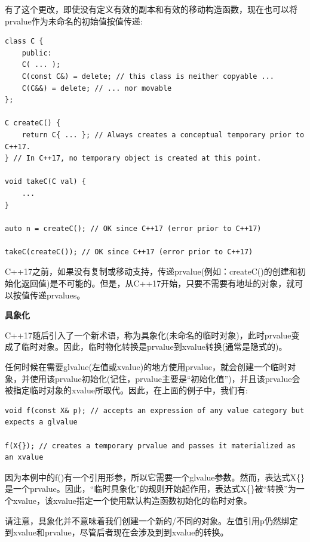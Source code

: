 有了这个更改，即使没有定义有效的副本和有效的移动构造函数，现在也可以将prvalue作为未命名的初始值按值传递:\par

\begin{lstlisting}[caption={}]
class C {
	public:
	C( ... );
	C(const C&) = delete; // this class is neither copyable ...
	C(C&&) = delete; // ... nor movable
};

C createC() {
	return C{ ... }; // Always creates a conceptual temporary prior to C++17.
} // In C++17, no temporary object is created at this point.

void takeC(C val) {
	...
}

auto n = createC(); // OK since C++17 (error prior to C++17)

takeC(createC()); // OK since C++17 (error prior to C++17)
\end{lstlisting}

C++17之前，如果没有复制或移动支持，传递prvalue(例如：createC()的创建和初始化返回值)是不可能的。但是，从C++17开始，只要不需要有地址的对象，就可以按值传递prvalues。\par

\hspace*{\fill} \par %
\textbf{具象化}

C++17随后引入了一个新术语，称为具象化(未命名的临时对象)，此时prvalue变成了临时对象。因此，临时物化转换是prvalue到xvalue转换(通常是隐式的)。\par

任何时候在需要glvalue(左值或xvalue)的地方使用prvalue，就会创建一个临时对象，并使用该prvalue初始化(记住，prvalue主要是“初始化值”)，并且该prvalue会被指定临时对象的xvalue所取代。因此，在上面的例子中，我们有:\par

\begin{lstlisting}[caption={}]
void f(const X& p); // accepts an expression of any value category but expects a glvalue

f(X{}); // creates a temporary prvalue and passes it materialized as an xvalue
\end{lstlisting}

因为本例中的f()有一个引用形参，所以它需要一个glvalue参数。然而，表达式X\{\}是一个prvalue。因此，“临时具象化”的规则开始起作用，表达式X\{\}被“转换”为一个xvalue，该xvalue指定一个使用默认构造函数初始化的临时对象。\par

请注意，具象化并不意味着我们创建一个新的/不同的对象。左值引用p仍然绑定到xvalue和prvalue，尽管后者现在会涉及到到xvalue的转换。\par






